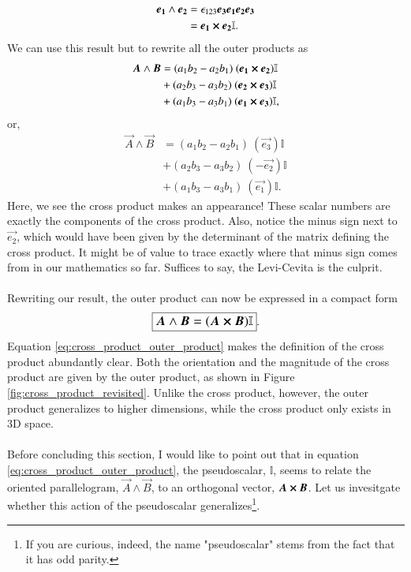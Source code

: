\begin{align*}
    \boldsymbol{e_1} \wedge \boldsymbol{e_2} &= \epsilon_{123} \boldsymbol{e_3} \boldsymbol{e_1} \boldsymbol{e_2} \boldsymbol{e_3} \\
                    &= \boldsymbol{e_1} \cross \boldsymbol{e_2} \mathbb{I}.
\end{align*}
We can use this result but to rewrite all the outer products as 
\begin{align*}
    \boldsymbol{A}  \wedge \boldsymbol{B}   &= (a_1 b_2 - a_2 b_1) \  (\boldsymbol{e_1} \cross \boldsymbol{e_2}) \mathbb{I} \\
                &+ (a_2 b_3 - a_3 b_2) \  (\boldsymbol{e_2} \cross \boldsymbol{e_3}) \mathbb{I} \\
                &+ (a_1 b_3 - a_3 b_1 ) \ (\boldsymbol{e_1} \cross \boldsymbol{e_3}) \mathbb{I},
\end{align*}
or, 
\begin{align*}
    \vec{A}  \wedge \vec{B}   &= (a_1 b_2 - a_2 b_1) \  (\vec{e_3}) \mathbb{I} \\
                &+ (a_2 b_3 - a_3 b_2) \  (-\vec{e_2}) \mathbb{I} \\
                &+ (a_1 b_3 - a_3 b_1 ) \ (\vec{e_1}) \mathbb{I}.
\end{align*}
Here, we see the cross product makes an appearance! These scalar numbers are exactly the components of the cross product. Also, notice the minus sign next to $\vec{e_2}$, which would have been given by the determinant of the matrix defining the cross product. It might be of value to trace exactly where that minus sign comes from in our mathematics so far. Suffices to say, the Levi-Cevita is the culprit.
\\ \\ 
Rewriting our result, the outer product can now be expressed in a compact form
\begin{equation}
    \label{eq:cross_product_outer_product}
    \large\boxed{\boldsymbol{A}  \wedge \boldsymbol{B}  = (\boldsymbol{A}  \cross \boldsymbol{B} ) \mathbb{I}}.
\end{equation}
Equation \eqref{eq:cross_product_outer_product} makes the definition of the cross product abundantly clear. Both the orientation and the magnitude of the cross product are given by the outer product, as shown in Figure \ref{fig:cross_product_revisited}. Unlike the cross product, however, the outer product generalizes to higher dimensions, while the cross product only exists in 3D space.
\\ \\
Before concluding this section, I would like to point out that in equation \eqref{eq:cross_product_outer_product}, the pseudoscalar, $\mathbb{I}$, seems to relate the oriented parallelogram, $\vec{A} \wedge \vec{B}$, to an orthogonal vector, $\boldsymbol{A} \cross \boldsymbol{B}$. Let us invesitgate whether this action of the pseudoscalar generalizes\footnote{If you are curious, indeed, the name "pseudoscalar" stems from the fact that it has odd parity.}.

